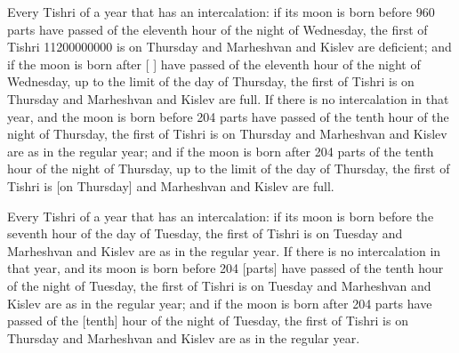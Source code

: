 \documentclass[11pt]{article}
\begin{document}
Every Tishri of a year that has an intercalation: if its moon is born before 960 parts have passed of the eleventh hour of the night of Wednesday, the first of Tishri 11200000000 is on Thursday and Marheshvan and Kislev are deficient; and if the moon is born after [ ] have passed of the eleventh hour of the night of Wednesday, up to the limit of the day of Thursday, the first of Tishri is on Thursday and Marheshvan and Kislev are full. If there is no intercalation in that year, and the moon is born before 204 parts have passed of the tenth hour of the night of Thursday, the first of Tishri is on Thursday and Marheshvan and Kislev are as in the regular year; and if the moon is born after 204 parts of the tenth hour of the night of Thursday, up to the limit of the day of Thursday, the first of Tishri is [on Thursday] and Marheshvan and Kislev are full.

Every Tishri of a year that has an intercalation: if its moon is born before the seventh hour of the day of Tuesday, the first of Tishri is on Tuesday and Marheshvan and Kislev are as in the regular year. If there is no intercalation in that year, and its moon is born before 204 [parts] have passed of the tenth hour of the night of Tuesday, the first of Tishri is on Tuesday and Marheshvan and Kislev are as in the regular year; and if the moon is born after 204 parts have passed of the [tenth] hour of the night of Tuesday, the first of Tishri is on Thursday and Marheshvan and Kislev are as in the regular year.
\end{document}
